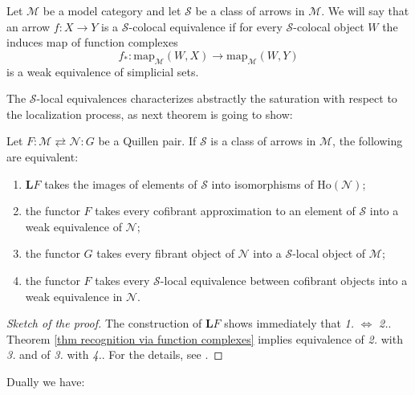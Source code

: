 \begin{refsection}
\begin{defin}
Let $\mathcal M$ be a model category and let $\mathcal S$ be a class of arrows in $\mathcal M$. We will say that an arrow $f \colon X \to Y$ is a $\mathcal S$-colocal equivalence if for every $\mathcal S$-colocal object $W$ the induces map of function complexes
\[
f_* \colon \mathrm{map}_{\mathcal M}(W,X) \to \mathrm{map}_{\mathcal M}(W,Y)
\]
is a weak equivalence of simplicial sets.
\end{defin}

The $\mathcal S$-local equivalences characterizes abstractly the saturation with respect to the localization process, as next theorem is going to show:

\begin{thm} \label{thm characterizing saturation wrt left localization}
Let $F \colon \mathcal M \rightleftarrows \mathcal N \colon G$ be a Quillen pair. If $\mathcal S$ is a class of arrows in $\mathcal M$, the following are equivalent:
\begin{enumerate}
\item $\mathbf L F$ takes the images of elements of $\mathcal S$ into isomorphisms of $\mathrm{Ho}(\mathcal N)$;
\item the functor $F$ takes every cofibrant approximation to an element of $\mathcal S$ into a weak equivalence of $\mathcal N$;
\item the functor $G$ takes every fibrant object of $\mathcal N$ into a $\mathcal S$-local object of $\mathcal M$;
\item the functor $F$ takes every $\mathcal S$-local equivalence between cofibrant objects into a weak equivalence in $\mathcal N$.
\end{enumerate}
\end{thm}

\begin{proof}[Sketch of the proof]
The construction of $\mathbf L F$ shows immediately that \emph{1.} $\iff$ \emph{2.}. Theorem \ref{thm recognition via function complexes} implies equivalence of \emph{2.} with \emph{3.} and of \emph{3.} with \emph{4.}. For the details, see \cite[Theorem 3.1.6]{hirschhorn}.
\end{proof}

Dually we have:


\end{refsection}
